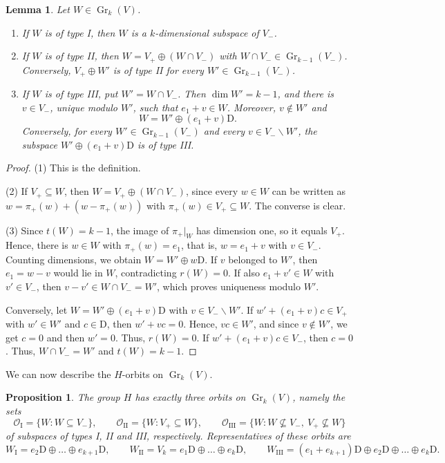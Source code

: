 \documentclass[11pt]{amsart}
\numberwithin{equation}{section}
\theoremstyle{plain}
\newtheorem{proposition}[theorem]{Proposition}
\newtheorem{lemma}[theorem]{Lemma}
\theoremstyle{definition}
\theoremstyle{remark}
\DeclareMathOperator{\Gr}{Gr}
\newcommand{\OI}{\mathcal{O}_{\mathrm{I}}}
\newcommand{\OII}{\mathcal{O}_{\mathrm{II}}}
\newcommand{\OIII}{\mathcal{O}_{\mathrm{III}}}
\newcommand{\WI}{W_{\mathrm{I}}}
\newcommand{\WII}{W_{\mathrm{II}}}
\newcommand{\WIII}{W_{\mathrm{III}}}
\begin{document}
\begin{lemma}\label{lem:normal-forms}
	Let $W\in\Gr_k(V)$.
	\begin{enumerate}
		\item If $W$ is of type I, then $W$ is a $k$-dimensional subspace of $V_-$.
		\item If $W$ is of type II, then $W=V_+\oplus(W\cap V_-)$ with $W\cap V_-\in\Gr_{k-1}(V_-)$. Conversely, $V_+\oplus W'$ is of type II for every $W'\in\Gr_{k-1}(V_-)$.
		\item If $W$ is of type III, put $W'=W\cap V_-$. Then $\dim W'=k-1$, and there is $v\in V_-$, unique modulo $W'$, such that $e_1+v\in W$. Moreover, $v\notin W'$ and
		$$
		W=W'\oplus(e_1+v)\mathrm{D}.
		$$
		Conversely, for every $W'\in\Gr_{k-1}(V_-)$ and every $v\in V_-\smallsetminus W'$, the subspace $W'\oplus(e_1+v)\mathrm{D}$ is of type III.
	\end{enumerate}
\end{lemma}

\begin{proof}
	(1) This is the definition.
	
	(2) If $V_+\subseteq W$, then $W=V_+\oplus(W\cap V_-)$, since every $w\in W$ can be written as $w=\pi_+(w)+(w-\pi_+(w))$ with $\pi_+(w)\in V_+\subseteq W$. The converse is clear.
	
	(3) Since $t(W)=k-1$, the image of $\pi_+|_W$ has dimension one, so it equals $V_+$. Hence, there is $w\in W$ with $\pi_+(w)=e_1$, that is, $w=e_1+v$ with $v\in V_-$. Counting dimensions, we obtain $W=W'\oplus w\mathrm{D}$. If $v$ belonged to $W'$, then $e_1=w-v$ would lie in $W$, contradicting $r(W)=0$. If also $e_1+v'\in W$ with $v'\in V_-$, then $v-v'\in W\cap V_-=W'$, which proves uniqueness modulo $W'$.
	
	Conversely, let $W=W'\oplus(e_1+v)\mathrm{D}$ with $v\in V_-\smallsetminus W'$. If $w'+(e_1+v)c\in V_+$ with $w'\in W'$ and $c\in\mathrm{D}$, then $w'+vc=0$. Hence, $vc\in W'$, and since $v\notin W'$, we get $c=0$ and then $w'=0$. Thus, $r(W)=0$. If $w'+(e_1+v)c\in V_-$, then $c=0$. Thus, $W\cap V_-=W'$ and $t(W)=k-1$.
\end{proof}

We can now describe the $H$-orbits on $\Gr_k(V)$.

\begin{proposition}\label{prop:three-orbits}
	The group $H$ has exactly three orbits on $\Gr_k(V)$, namely the sets
	$$
	\OI=\{W:W\subseteq V_-\},\qquad\OII=\{W:V_+\subseteq W\},\qquad\OIII=\{W:W\not\subseteq V_-,\ V_+\not\subseteq W\}
	$$
	of subspaces of types I, II and III, respectively. Representatives of these orbits are
	$$
	\WI=e_2\mathrm{D}\oplus\dots\oplus e_{k+1}\mathrm{D},\qquad\WII=V_k=e_1\mathrm{D}\oplus\dots\oplus e_k\mathrm{D},\qquad\WIII=(e_1+e_{k+1})\mathrm{D}\oplus e_2\mathrm{D}\oplus\dots\oplus e_k\mathrm{D}.
	$$
\end{proposition}
\end{document}
